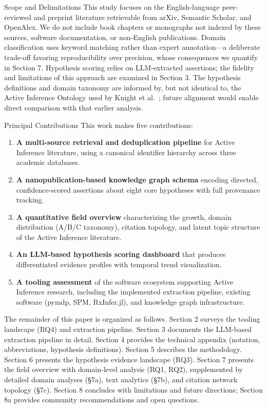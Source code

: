 \documentclass[
  ignorenonframetext,
]{beamer}
\begin{document}
\begin{frame}{Scope and Delimitations}
\protect{}\label{scope-and-delimitations}
This study focuses on the English-language peer-reviewed and preprint
literature retrievable from arXiv, Semantic Scholar, and OpenAlex. We do
not include book chapters or monographs not indexed by these sources,
software documentation, or non-English publications. Domain
classification uses keyword matching rather than expert annotation---a
deliberate trade-off favoring reproducibility over precision, whose
consequences we quantify in Section 7. Hypothesis scoring relies on
LLM-extracted assertions; the fidelity and limitations of this approach
are examined in Section 3. The hypothesis definitions and domain
taxonomy are informed by, but not identical to, the Active Inference
Ontology used by Knight et al.~\citep{knight2022fep}; future alignment
would enable direct comparison with that earlier analysis.
\end{frame}

\begin{frame}{Principal Contributions}
\protect{}\label{principal-contributions}
This work makes five contributions:

\begin{enumerate}
\item
  \textbf{A multi-source retrieval and deduplication pipeline} for
  Active Inference literature, using a canonical identifier hierarchy
  across three academic databases.
\item
  \textbf{A nanopublication-based knowledge graph schema} encoding
  directed, confidence-scored assertions about eight core hypotheses
  with full provenance tracking.
\item
  \textbf{A quantitative field overview} characterizing the growth,
  domain distribution (A/B/C taxonomy), citation topology, and latent
  topic structure of the Active Inference literature.
\item
  \textbf{An LLM-based hypothesis scoring dashboard} that produces
  differentiated evidence profiles with temporal trend visualization.
\item
  \textbf{A tooling assessment} of the software ecosystem supporting
  Active Inference research, including the implemented extraction
  pipeline, existing software (pymdp, SPM, RxInfer.jl), and knowledge
  graph infrastructure.
\end{enumerate}

The remainder of this paper is organized as follows. Section 2 surveys
the tooling landscape (RQ4) and extraction pipeline. Section 3 documents
the LLM-based extraction pipeline in detail. Section 4 provides the
technical appendix (notation, abbreviations, hypothesis definitions).
Section 5 describes the methodology. Section 6 presents the hypothesis
evidence landscape (RQ3). Section 7 presents the field overview with
domain-level analysis (RQ1, RQ2), supplemented by detailed domain
analyses (§7a), text analytics (§7b), and citation network topology
(§7c). Section 8 concludes with limitations and future directions;
Section 8a provides community recommendations and open questions.
\end{frame}
\end{document}

